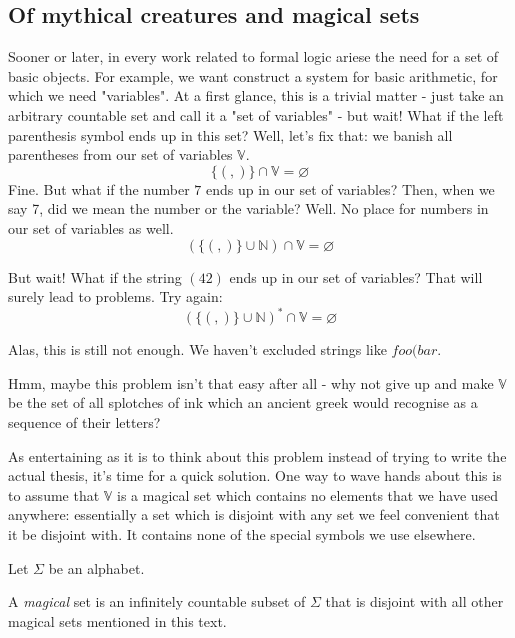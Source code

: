 \documentclass[main.tex]{subfiles}
\begin{document}
\subsection{Of mythical creatures and magical sets}

Sooner or later, in every work related to formal logic ariese the need for
a set of basic objects. For example, we want construct a system for basic
arithmetic, for which we need "variables".
At a first glance, this is a trivial matter - just take an arbitrary countable
set and call it a "set of variables" - but wait! What if the left parenthesis
symbol ends up in this set? Well, let's fix that: we banish all parentheses
from our set of variables $\mathbb{V}$.
\[ \{ (, ) \} \cap \mathbb{V} = \varnothing \]
Fine. But what if the number $7$ ends up in our set of variables? Then,
when we say 7, did we mean the number or the variable? Well. No place for
numbers in our set of variables as well.
\[ ( \{ (, ) \} \cup \mathbb{N} ) \cap \mathbb{V} = \varnothing \]

But wait! What if the string $(42)$ ends up in our set of variables? That will
surely lead to problems. Try again:
\[ ( \{ (, ) \} \cup \mathbb{N} )^* \cap \mathbb{V} = \varnothing \]

Alas, this is still not enough. We haven't excluded strings like $foo(bar$.

Hmm, maybe this problem isn't that easy after all - why not give up and make
$\mathbb{V}$ be the set of all splotches of ink which an ancient greek would
recognise as a sequence of their letters?

As entertaining as it is to think about this problem instead of trying to write
the actual thesis, it's time for a quick solution. One way to wave hands
about this is to assume that $\mathbb{V}$ is a magical set which contains
no elements that we have used anywhere: essentially a set which is disjoint
with any set we feel convenient that it be disjoint with. It contains none of
the special symbols we use elsewhere.



Let $\Sigma$ be an alphabet.
\begin{defn}
    A \emph{magical} set is an infinitely countable subset of $\Sigma$
    that is disjoint with all other magical sets mentioned in this text.
\end{defn}
\end{document}
